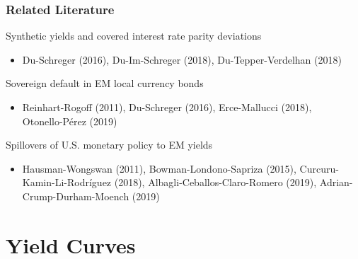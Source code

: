 \documentclass[12pt, aspectratio=169, xcolor=dvipsnames]{beamer}
\begin{document}
\begin{frame}[label=LitReview]
	\frametitle{Related Literature}
	
	\alert{Synthetic yields} and covered interest rate parity deviations
	\begin{itemize}
		\item {\footnotesize Du-Schreger (2016), Du-Im-Schreger (2018), Du-Tepper-Verdelhan (2018)}
	\end{itemize}

	\alert{Sovereign default} in EM local currency bonds
	\begin{itemize}
		\item {\footnotesize Reinhart-Rogoff (2011), Du-Schreger (2016), Erce-Mallucci (2018), \\ Otonello-Pérez (2019)}
	\end{itemize}
	
	\alert{Spillovers} of U.S. monetary policy to EM yields
	\begin{itemize}
		\item {\footnotesize Hausman-Wongswan (2011), Bowman-Londono-Sapriza (2015), Curcuru-Kamin-Li-Rodríguez (2018), Albagli-Ceballos-Claro-Romero (2019), Adrian-Crump-Durham-Moench (2019)}
	\end{itemize}
\end{frame}


\section{Yield Curves}
\end{document}
